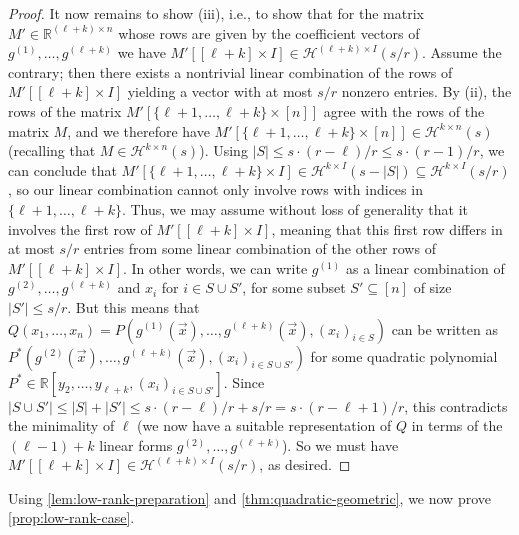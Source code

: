 \documentclass[english]{article}
\theoremstyle{remark}
\numberwithin{equation}{section}
\numberwithin{figure}{section}
\newcommand{\su}{\subseteq}
\begin{document}
\begin{proof}
It now remains to show (iii), i.e., to show that for the matrix $M'\in \mathbb{R}^{(\ell+k)\times n}$ whose rows are given by the coefficient vectors of $g^{(1)},\dots,g^{({\ell+k})}$ we have $M'[[\ell+k]\times I]\in \mathcal{H}^{(\ell+k)\times I}(s/r)$. Assume the contrary; then there exists a nontrivial linear combination of the rows of $M'[[\ell+k]\times I]$ yielding a vector with at most $s/r$ nonzero entries. By (ii), the rows of the matrix $M'[\{\ell+1,\dots,\ell+k\}\times [n]]$ agree with the rows of the matrix $M$, and we therefore have $M'[\{\ell+1,\dots,\ell+k\}\times [n]]\in \mathcal{H}^{k\times n}(s)$ (recalling that $M\in \mathcal{H}^{k\times n}(s)$). Using $|S|\le s\cdot (r-\ell)/r\le s\cdot (r-1)/r$, we can conclude that  $M'[\{\ell+1,\dots,\ell+k\}\times I]\in \mathcal{H}^{k\times I}(s-|S|)\su \mathcal{H}^{k\times I}(s/r)$, so our linear combination cannot only involve rows with indices in $\{\ell+1,\dots,\ell+k\}$. Thus, we may assume without loss of generality that it involves the first row of $M'[[\ell+k]\times I]$, meaning that this first row differs in at most $s/r$ entries from some linear combination of the other rows of $M'[[\ell+k]\times I]$. In other words, we can write $g^{({1})}$ as a linear combination of $g^{(2)},\dots,g^{({\ell+k})}$ and $x_i$ for $i\in S\cup S'$, for some subset $S'\su [n]$ of size $|S'|\le s/r$. But this means that $Q(x_1,\dots,x_n)=P(g^{(1)}(\vec{x}),\dots,g^{({\ell+k})}(\vec{x}), (x_i)_{i\in S})$ can be written as $P^*(g^{(2)}(\vec{x}),\dots,g^{({\ell+k})}(\vec{x}), (x_i)_{i\in S\cup S'})$ for some quadratic polynomial $P^*\in \mathbb{R}[y_2,\dots,y_{\ell+k}, (x_i)_{i\in S\cup S'}]$. Since $|S\cup S'|\le |S|+|S'|\le s\cdot (r-\ell)/r+s/r=s\cdot (r-\ell+1)/r$, this contradicts the minimality of $\ell$ (we now have a suitable representation of $Q$ in terms of the $(\ell-1)+k$  linear forms $g^{(2)},\dots,g^{({\ell+k})}$).
So we must have $M'[[\ell+k]\times I]\in \mathcal{H}^{(\ell+k)\times I}(s/r)$, as desired.
\end{proof}

Using \cref{lem:low-rank-preparation} and \cref{thm:quadratic-geometric}, we now prove \cref{prop:low-rank-case}.
\end{document}
